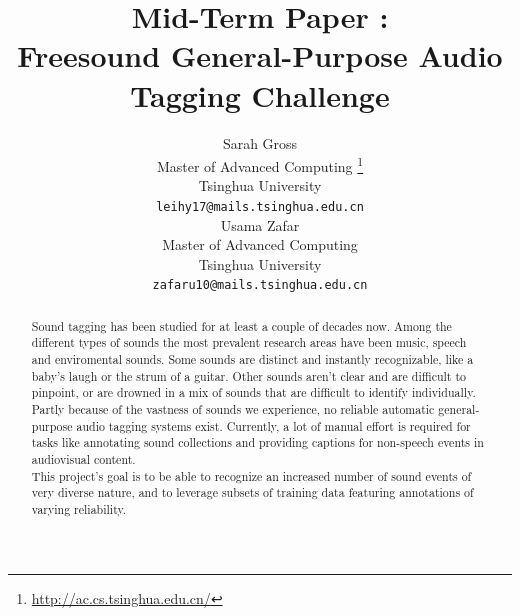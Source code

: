 \documentclass{article} %
\title{Mid-Term Paper : \\Freesound General-Purpose Audio Tagging Challenge}
\author{
Sarah Gross \\
Master of Advanced Computing \thanks{\url{http://ac.cs.tsinghua.edu.cn/}}\\
Tsinghua University\\
\texttt{leihy17@mails.tsinghua.edu.cn} \\
\And
Usama Zafar\\
Master of Advanced Computing\\
Tsinghua University\\
\texttt{zafaru10@mails.tsinghua.edu.cn} \\
}
\begin{document}
\maketitle

\begin{abstract}
	Sound tagging has been studied for at least a couple of decades now. Among the different types of sounds the most prevalent research areas have been music, speech and enviromental sounds. Some sounds are distinct and instantly recognizable, like a baby's laugh or the strum of a guitar. Other sounds aren't clear and are difficult to pinpoint, or are drowned in a mix of sounds that are difficult to identify individually.\\
	\newline
    Partly because of the vastness of sounds we experience, no reliable automatic general-purpose audio tagging systems exist. Currently, a lot of manual effort is required for tasks like annotating sound collections and providing captions for non-speech events in audiovisual content.\\
	\newline
    This project's goal is to be able to recognize an increased number of sound events of very diverse nature, and to leverage subsets of training data featuring annotations of varying reliability.
\end{abstract}
\end{document}

